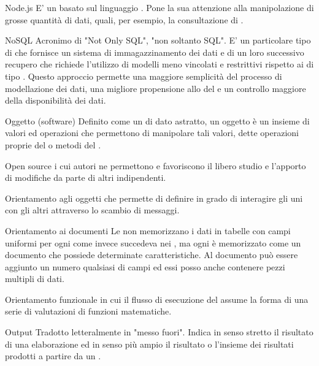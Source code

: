 
\elemento
{Node.js}
{E' un  basato sul linguaggio . Pone la sua attenzione alla manipolazione di grosse quantità di dati, quali, per esempio, la consultazione di .}

\elemento
{NoSQL}
{Acronimo di "Not Only SQL", "non soltanto SQL". E' un particolare tipo di  che fornisce un sistema di immagazzinamento dei dati e di un loro successivo recupero che richiede l'utilizzo di modelli meno vincolati e restrittivi rispetto ai  di tipo . Questo approccio permette una maggiore semplicità del processo di modellazione dei dati, una migliore propensione allo  del  e un controllo maggiore della disponibilità dei dati.}


\elemento
{Oggetto (software)}
{Definito come un  di dato astratto, un oggetto è un insieme di valori ed operazioni che permettono di manipolare tali valori, dette operazioni proprie del  o metodi del .}

\elemento
{Open source}
{ i cui autori ne permettono e favoriscono il libero studio e l'apporto di modifiche da parte di altri  indipendenti.}

\elemento
{Orientamento agli oggetti}
{ che permette di definire  in grado di interagire gli uni con gli altri attraverso lo scambio di messaggi.}

\elemento
{Orientamento ai documenti}
{Le   non memorizzano i dati in tabelle con campi uniformi per ogni  come invece succedeva nei , ma ogni  è memorizzato come un documento che possiede determinate caratteristiche. Al documento può essere aggiunto un numero qualsiasi di campi ed essi posso anche contenere pezzi multipli di dati.}

\elemento
{Orientamento funzionale}
{ in cui il flusso di esecuzione del  assume la forma di una serie di valutazioni di funzioni matematiche.}

\elemento
{Output}
{Tradotto letteralmente in "messo fuori". Indica in senso stretto il risultato di una elaborazione ed in senso più ampio il risultato o l'insieme dei risultati prodotti a partire da un .}


